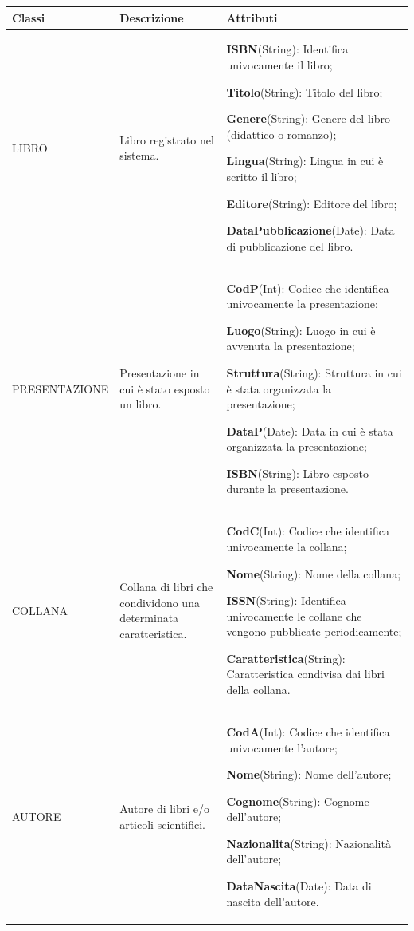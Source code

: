 \documentclass{article}
\begin{document}
\newpage
\begin{table}[h]
\centering
\begin{tabular}{|p{5cm}|p{3cm}|p{7cm}|}
    \hline
    \textbf{Classi} & \textbf{Descrizione} & \textbf{Attributi} \\\hline

    LIBRO & Libro registrato nel sistema. & \textbf{ISBN}(String): Identifica univocamente il libro; \par
    \textbf{Titolo}(String): Titolo del libro; \par 
    \textbf{Genere}(String): Genere del libro (didattico o romanzo); \par
    \textbf{Lingua}(String): Lingua in cui è scritto il libro; \par   
    \textbf{Editore}(String): Editore del libro; \par  
    \textbf{DataPubblicazione}(Date): Data di pubblicazione del libro.\\\hline

    PRESENTAZIONE & Presentazione in cui è stato esposto un libro. & \textbf{CodP}(Int):  Codice che identifica univocamente la presentazione; \par
    \textbf{Luogo}(String): Luogo in cui è avvenuta la presentazione; \par
    \textbf{Struttura}(String): Struttura in cui è stata organizzata la presentazione; \par
    \textbf{DataP}(Date): Data in cui è stata organizzata la presentazione; \par
    \textbf{ISBN}(String): Libro esposto durante la presentazione.\\\hline 

    COLLANA & Collana di libri che condividono una determinata caratteristica. & \textbf{CodC}(Int): Codice che identifica univocamente la collana; \par
    \textbf{Nome}(String): Nome della collana; \par
    \textbf{ISSN}(String): Identifica univocamente le collane che vengono pubblicate periodicamente; \par
    \textbf{Caratteristica}(String): Caratteristica condivisa dai libri della collana.\\\hline

    AUTORE & Autore di libri e/o articoli scientifici. & \textbf{CodA}(Int): Codice che identifica univocamente l'autore; \par 
    \textbf{Nome}(String): Nome dell'autore; \par
    \textbf{Cognome}(String): Cognome dell'autore; \par
    \textbf{Nazionalita}(String): Nazionalità dell'autore; \par
    \textbf{DataNascita}(Date): Data di nascita dell'autore.\\\hline
\end{tabular}
\end{table}
\end{document}
